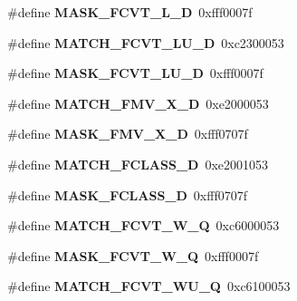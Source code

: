 \begin{DoxyCompactItemize}
\mbox{\label{riscv-utility_8h_a425317e6c60dfa35304a49d70da8727f}} 
\#define {\bfseries M\+A\+S\+K\+\_\+\+F\+C\+V\+T\+\_\+\+L\+\_\+D}~0xfff0007f
\item 
\mbox{\label{riscv-utility_8h_abb0c234927ee7e88c666d3803401853f}} 
\#define {\bfseries M\+A\+T\+C\+H\+\_\+\+F\+C\+V\+T\+\_\+\+L\+U\+\_\+D}~0xc2300053
\item 
\mbox{\label{riscv-utility_8h_ab78bfef3947362fcc94257ef555e0674}} 
\#define {\bfseries M\+A\+S\+K\+\_\+\+F\+C\+V\+T\+\_\+\+L\+U\+\_\+D}~0xfff0007f
\item 
\mbox{\label{riscv-utility_8h_ae627e05ce6a1b2b3a815b10be952d091}} 
\#define {\bfseries M\+A\+T\+C\+H\+\_\+\+F\+M\+V\+\_\+\+X\+\_\+D}~0xe2000053
\item 
\mbox{\label{riscv-utility_8h_ac02159a26f43d538cf18fa6bb4fd6557}} 
\#define {\bfseries M\+A\+S\+K\+\_\+\+F\+M\+V\+\_\+\+X\+\_\+D}~0xfff0707f
\item 
\mbox{\label{riscv-utility_8h_a8ca2b27f5bcf9c6f8c2d4ee8f562fd26}} 
\#define {\bfseries M\+A\+T\+C\+H\+\_\+\+F\+C\+L\+A\+S\+S\+\_\+D}~0xe2001053
\item 
\mbox{\label{riscv-utility_8h_a9f36220be05b22741217b70250f02a2b}} 
\#define {\bfseries M\+A\+S\+K\+\_\+\+F\+C\+L\+A\+S\+S\+\_\+D}~0xfff0707f
\item 
\mbox{\label{riscv-utility_8h_a24246c7efbb1353ea10d7199780cc0e3}} 
\#define {\bfseries M\+A\+T\+C\+H\+\_\+\+F\+C\+V\+T\+\_\+\+W\+\_\+Q}~0xc6000053
\item 
\mbox{\label{riscv-utility_8h_a475bf9e116e49770c24e4645664fdf43}} 
\#define {\bfseries M\+A\+S\+K\+\_\+\+F\+C\+V\+T\+\_\+\+W\+\_\+Q}~0xfff0007f
\item 
\mbox{\label{riscv-utility_8h_a835ef853b49edbb557e419a419917cad}} 
\#define {\bfseries M\+A\+T\+C\+H\+\_\+\+F\+C\+V\+T\+\_\+\+W\+U\+\_\+Q}~0xc6100053
\item 
\mbox{\label{riscv-utility_8h_a1e14d2f31f0ca041a3b5b86612754a2f}} 

\end{DoxyCompactItemize}
